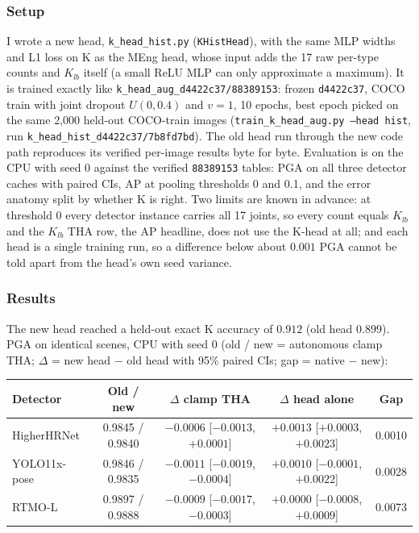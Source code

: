 \subsubsection{Setup}

I wrote a new head, \texttt{k\_head\_hist.py} (\texttt{KHistHead}), with the same MLP widths and L1 loss on K as the MEng head, whose input adds the 17 raw per-type counts and $K_{lb}$ itself (a small ReLU MLP can only approximate a maximum).
It is trained exactly like \texttt{k\_head\_aug\_d4422c37/88389153}: frozen \texttt{d4422c37}, COCO train with joint dropout $U(0, 0.4)$ and $v = 1$, 10 epochs, best epoch picked on the same 2,000 held-out COCO-train images (\texttt{train\_k\_head\_aug.py --head hist}, run \texttt{k\_head\_hist\_d4422c37/7b8fd7bd}).
The old head run through the new code path reproduces its verified per-image results byte for byte.
Evaluation is on the CPU with seed 0 against the verified \texttt{88389153} tables: PGA on all three detector caches with paired CIs, AP at pooling thresholds 0 and 0.1, and the error anatomy split by whether K is right.
Two limits are known in advance: at threshold 0 every detector instance carries all 17 joints, so every count equals $K_{lb}$ and the $K_{lb}$ THA row, the AP headline, does not use the K-head at all; and each head is a single training run, so a difference below about $0.001$ PGA cannot be told apart from the head's own seed variance.

\subsubsection{Results}

The new head reached a held-out exact K accuracy of $0.912$ (old head $0.899$).
PGA on identical scenes, CPU with seed 0 (old / new = autonomous clamp THA; $\Delta$ = new head $-$ old head with 95\% paired CIs; gap = native $-$ new):

{\small
\begin{tabular}{lcccc}
\hline
\textbf{Detector} & \textbf{Old / new} & \textbf{$\Delta$ clamp THA} & \textbf{$\Delta$ head alone} & \textbf{Gap} \\
\hline
HigherHRNet  & 0.9845 / 0.9840 & $-0.0006$ [$-0.0013$, $+0.0001$] & $+0.0013$ [$+0.0003$, $+0.0023$] & 0.0010 \\
YOLO11x-pose & 0.9846 / 0.9835 & $-0.0011$ [$-0.0019$, $-0.0004$] & $+0.0010$ [$-0.0001$, $+0.0022$] & 0.0028 \\
RTMO-L       & 0.9897 / 0.9888 & $-0.0009$ [$-0.0017$, $-0.0003$] & $+0.0000$ [$-0.0008$, $+0.0009$] & 0.0073 \\
\hline
\end{tabular}
}

